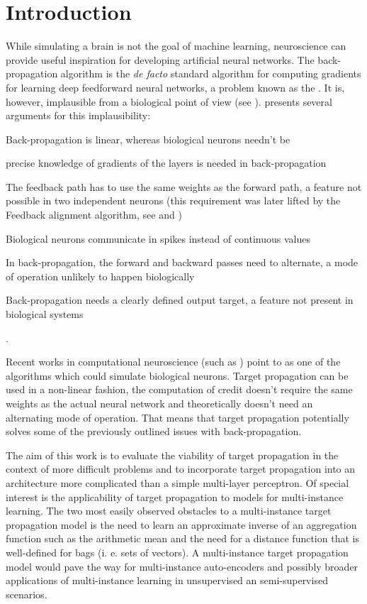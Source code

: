\chapter*{Introduction}

While simulating a brain is not the goal of machine learning, neuroscience can provide useful inspiration for developing artificial neural networks. The back-propagation algorithm is the \textit{de facto} standard algorithm for computing gradients for learning deep feedforward neural networks, a problem known as the . It is, however, implausible from a biological point of view (see \cite{crick_recent_1989}). \cite{bengio_towards_2015} presents several arguments for this implausibility:
\begin{enumerate*}[label=(\arabic*)]
	\item Back-propagation is linear, whereas biological neurons needn't be
	\item precise knowledge of gradients of the layers is needed in back-propagation
	\item The feedback path has to use the same weights as the forward path, a feature not possible in two independent neurons (this requirement was later lifted by the Feedback alignment algorithm, see \cite{lillicrap_random_2016} and \cite{nokland_direct_2016})
	\item Biological neurons communicate in spikes instead of continuous values
	\item In back-propagation, the forward and backward passes need to alternate, a mode of operation unlikely to happen biologically
	\item Back-propagation needs a clearly defined output target, a feature not present in biological systems
\end{enumerate*}.

Recent works in computational neuroscience (such as \cite{guerguiev_towards_2017}) point to  as one of the algorithms which could simulate biological neurons. Target propagation can be used in a non-linear fashion, the computation of credit doesn't require the same weights as the actual neural network and theoretically doesn't need an alternating mode of operation. That means that target propagation potentially solves some of the previously outlined issues with back-propagation.

The aim of this work is to evaluate the viability of target propagation in the context of more difficult problems and to incorporate target propagation into an architecture more complicated than a simple multi-layer perceptron. Of special interest is the applicability of target propagation to models for multi-instance learning. The two most easily observed obstacles to a multi-instance target propagation model is the need to learn an approximate inverse of an aggregation function such as the arithmetic mean and the need for a distance function that is well-defined for bags (i. e. sets of vectors). A multi-instance target propagation model would pave the way for multi-instance auto-encoders and possibly broader applications of multi-instance learning in unsupervised an semi-supervised scenarios.

